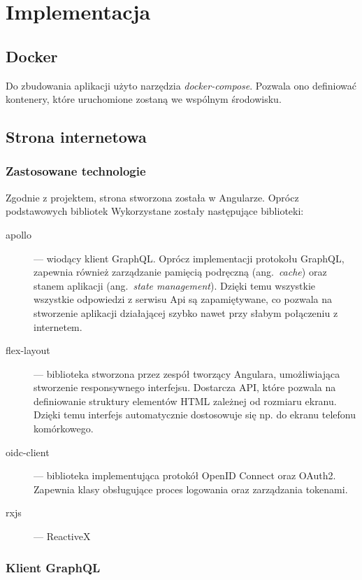 \chapter{Implementacja}
\label{sec:implementacja}

\section{Docker}
	Do zbudowania aplikacji użyto narzędzia \emph{docker-compose}.
	Pozwala ono definiować kontenery, które uruchomione zostaną we wspólnym środowisku.
	

\section{Strona internetowa}
	\subsection{Zastosowane technologie}
		Zgodnie z projektem, strona stworzona została w Angularze.
		Oprócz podstawowych bibliotek Wykorzystane zostały następujące biblioteki:
		\begin{description}
			\item[apollo] --- wiodący klient GraphQL. Oprócz implementacji protokołu GraphQL,
			zapewnia również zarządzanie pamięcią podręczną (ang.\ \emph{cache}) oraz stanem aplikacji (ang.\ \emph{state management}).
			Dzięki temu wszystkie wszystkie odpowiedzi z serwisu Api są zapamiętywane,
			co pozwala na stworzenie aplikacji działającej szybko nawet przy słabym połączeniu z internetem.
			
			\item[flex-layout] --- biblioteka stworzona przez zespół tworzący Angulara, umożliwiająca stworzenie responsywnego interfejsu.
				Dostarcza API, które pozwala na definiowanie struktury elementów HTML zależnej od rozmiaru ekranu.
				Dzięki temu interfejs automatycznie dostosowuje się np. do ekranu telefonu komórkowego.
			
			\item[oidc-client] --- biblioteka implementująca protokół OpenID Connect oraz OAuth2.
				Zapewnia klasy obsługujące proces logowania oraz zarządzania tokenami.

			\item[rxjs] --- ReactiveX 

		\end{description}

	\subsection{Klient GraphQL}

